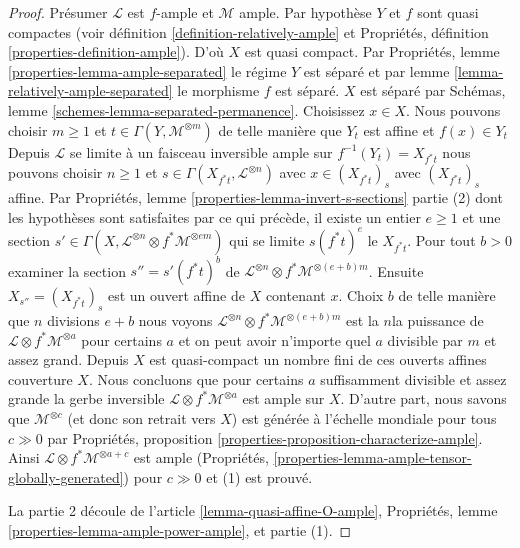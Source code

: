 \begin{proof}

Présumer $\mathcal{L}$ est $f$-ample et $\mathcal{M}$ ample. Par hypothèse $Y$ et $f$ sont quasi compactes (voir définition \ref{definition-relatively-ample} et Propriétés, définition \ref{properties-definition-ample}). D'où $X$ est quasi compact. Par Propriétés, lemme
\ref{properties-lemma-ample-separated} le régime $Y$ est séparé et par lemme \ref{lemma-relatively-ample-separated}
le morphisme $f$ est séparé. $X$ est séparé par Schémas, lemme \ref{schemes-lemma-separated-permanence}. Choisissez $x \in X$. Nous pouvons choisir $m \geq 1$
et $t \in \Gamma(Y, \mathcal{M}^{\otimes m})$ de telle manière que $Y_t$
est affine et $f(x) \in Y_t$Depuis $\mathcal{L}$ se limite à un faisceau inversible ample sur $f^{-1}(Y_t) = X_{f^*t}$
nous pouvons choisir $n \geq 1$ et $s \in \Gamma(X_{f^*t}, \mathcal{L}^{\otimes n})$
avec $x \in (X_{f^*t})_s$ avec $(X_{f^*t})_s$ affine. Par Propriétés, lemme \ref{properties-lemma-invert-s-sections} partie (2) dont les hypothèses sont satisfaites par ce qui précède, il existe un entier $e \geq 1$ et une section
$s' \in \Gamma(X, \mathcal{L}^{\otimes n} \otimes f^*\mathcal{M}^{\otimes em})$
qui se limite $s(f^*t)^e$ le $X_{f^*t}$. Pour tout $b > 0$
examiner la section $s'' = s'(f^*t)^b$ de
$\mathcal{L}^{\otimes n} \otimes f^*\mathcal{M}^{\otimes (e + b)m}$. Ensuite $X_{s''} = (X_{f^*t})_s$ est un ouvert affine de $X$ contenant $x$. Choix $b$ de telle manière que $n$ divisions $e + b$ nous voyons
$\mathcal{L}^{\otimes n} \otimes f^*\mathcal{M}^{\otimes (e + b)m}$
est la $n$la puissance de $\mathcal{L} \otimes f^*\mathcal{M}^{\otimes a}$
pour certains $a$ et on peut avoir n'importe quel $a$ divisible par $m$ et assez grand. Depuis $X$ est quasi-compact un nombre fini de ces ouverts affines couverture $X$. Nous concluons que pour certains $a$ suffisamment divisible et assez grande la gerbe inversible
$\mathcal{L} \otimes f^*\mathcal{M}^{\otimes a}$ est ample sur $X$. D'autre part, nous savons que $\mathcal{M}^{\otimes c}$
(et donc son retrait vers $X$) est générée à l'échelle mondiale pour tous $c \gg 0$
par Propriétés, proposition \ref{properties-proposition-characterize-ample}. Ainsi $\mathcal{L} \otimes f^*\mathcal{M}^{\otimes a + c}$ est ample (Propriétés, \ref{properties-lemma-ample-tensor-globally-generated}) pour $c \gg 0$ et (1) est prouvé.

\medskip\noindent

La partie 2 découle de l'article \ref{lemma-quasi-affine-O-ample}, Propriétés, lemme \ref{properties-lemma-ample-power-ample}, et partie (1).

\end{proof}

